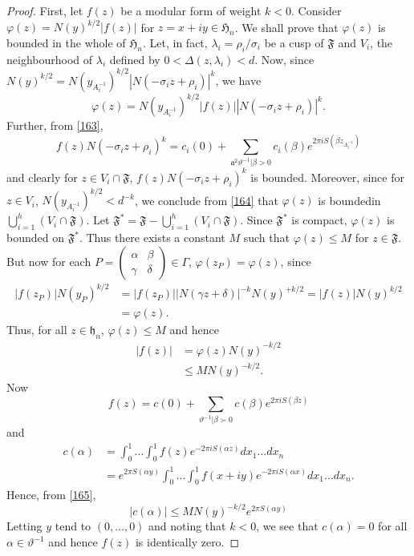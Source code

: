\begin{proof}
First, let $f(z)$ be a modular form of weight $k<0$. Consider
$\varphi(z)=N(y)^{k/2}|f(z)|$ for $z=x+iy\in\mathfrak{H}_{n}$. We
shall prove that $\varphi(z)$ is bounded in the whole of
$\mathfrak{H}_{n}$. Let, in fact, $\lambda_{i}=\rho_{i}/\sigma_{i}$ be
a cusp of $\mathfrak{F}$ and $V_{i}$, the neighbourhood of
$\lambda_{i}$ defined by $0<\Delta(z,\lambda_{i})<d$. Now, since
$N(y)^{k/2}=N(y_{A^{-1}_{i}})^{k/2}|N(-\sigma_{i}z+\rho_{i})|^{k}$, we
have
\begin{equation*}
\varphi(z) = N(y_{A^{-1}_{i}})^{k/2}|f(z) ||
N(-\sigma_{i}z+\rho_{i})|^{k}
.\tag{164}\label{164}  
\end{equation*}
Further, from \eqref{163},
$$
f(z)N(- \sigma_{i} z +
\rho_{i})^{k} = c_{i}(0) + \sum_{\mathfrak{a}^{2} \vartheta^{-1}
  |\beta>0}c_{i}(\beta)e^{2\pi  
  iS(\beta z_{A^{-1}_{i}})} 
$$
and clearly for $z\in V_{i}\cap \mathfrak{F}$,
$f(z)N(-\sigma_{i}z+\rho_{i})^{k}$ is bounded. Moreover, since for
$z\in V_{i}$, $N(y_{A^{-1}_{i}})^{k/2}<d^{-k}$, we conclude from
\eqref{164} that $\varphi(z)$ is bounded\pageoriginale in
$\bigcup\limits^{h}_{i=1}(V_{i}\cap \mathfrak{F})$. Let
$\mathfrak{F}^{\ast}=\mathfrak{F}-\bigcup\limits^{h}_{i=1}(V_{i}\cap\mathfrak{F})$. Since
$\mathfrak{F}^{\ast}$ is compact, $\varphi(z)$ is bounded on
$\mathfrak{F}^{\ast}$. Thus there exists a constant $M$ such that
$\varphi(z)\leq M$ for $z\in\mathfrak{F}$. But now for each
$P=\left(\begin{smallmatrix} \alpha & \beta\\ \gamma & \delta 
\end{smallmatrix}\right)\in\Gamma$, $\varphi(z_{P})=\varphi(z)$, since
\begin{align*}
|f(z_{P})|N(y_{P})^{k/2} &= |f(z_{P})||N(\gamma
z+\delta)|^{-k}N(y)^{+k/2}=|f(z)|N(y)^{k/2}\\
&=\varphi(z). 
\end{align*}
Thus, for all $z\in \mathfrak{h}_{n}$, $\varphi(z)\leq M$ and hence
\begin{equation*}
\begin{aligned}
|f(z)| &= \varphi(z)N(y)^{-k/2}\\
&\leq MN(y)^{-k/2}.
\end{aligned}\tag{165}\label{165}
\end{equation*}
Now
$$
f(z)=c(0)+\sum_{\vartheta^{-1}|\beta \succ 0}c(\beta)e^{2\pi iS(\beta z)}
$$
and
\begin{align*}
c(\alpha) &= \int^{1}_{0}\ldots\int^{1}_{0}f(z)e^{-2\pi iS(\alpha
  z)}dx_{1}\ldots dx_{n}\\
&= e^{2\pi S(\alpha y)}\int^{1}_{0}\ldots\int^{1}_{0}f(x+iy)e^{-2\pi
  iS(\alpha x)}dx_{1}\ldots dx_{n}.
\end{align*}
Hence, from \eqref{165},
$$
|c(\alpha)|\leq MN(y)^{-k/2}e^{2\pi S(\alpha y)}
$$
Letting $y$ tend to $(0,\ldots,0)$ and noting that $k<0$, we see that
$c(\alpha)=0$ for all $\alpha\in\vartheta^{-1}$ and hence $f(z)$ is
identically zero.
\end{proof}

